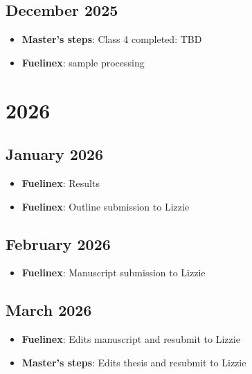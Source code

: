\documentclass{article}
\begin{document}
\subsection*{December 2025}
\begin{itemize}
    \item \textbf{Master's steps}: Class 4 completed: TBD
    \item \textbf{Fuelinex}: sample processing
\end{itemize}

\section*{\centering \Large 2026}

\subsection*{January 2026}
\begin{itemize}
    \item \textbf{Fuelinex}: Results
    \item \textbf{Fuelinex}: Outline submission to Lizzie
\end{itemize}

\subsection*{February 2026}
\begin{itemize}
    \item \textbf{Fuelinex}: Manuscript submission to Lizzie
\end{itemize}

\subsection*{March 2026}
\begin{itemize}
    \item \textbf{Fuelinex}: Edits manuscript and resubmit to Lizzie
    \item \textbf{Master's steps}: Edits thesis and resubmit to Lizzie
\end{itemize}
\end{document}
